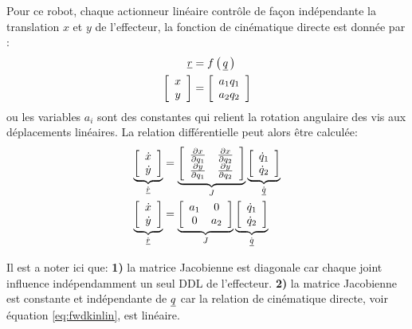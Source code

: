 \begin{example}
Pour ce robot, chaque actionneur linéaire contrôle de façon indépendante la translation $x$ et $y$ de l'effecteur, la fonction de cinématique directe est donnée par :
\begin{align}
\quad \underline{r} &= f\left( \, \underline{q} \, \right)  \\
\left[ \begin{array}{c} x \\ y  \end{array} \right]  &= \left[ \begin{array}{c} a_1 q_1 \\ a_2 q_2  \end{array} \right]
\label{eq:fwdkinlin}
\end{align}
ou les variables $a_i$ sont des constantes qui relient la rotation angulaire des vis aux déplacements linéaires. La relation différentielle peut alors être calculée:
\begin{align}
\underbrace{ \left[ \begin{array}{c} \dot{x} \\ \dot{y}  \end{array} \right] }_{\dot{\underline{r}}}
 &= 
\underbrace{ \left[ \begin{array}{c c } 
\frac{\partial x }{\partial q_1}   & \frac{\partial x }{\partial q_2} \\ 
\frac{\partial y }{\partial q_1}   & \frac{\partial y }{\partial q_2}
\end{array} \right]  }_{ J } 
\underbrace{ \left[ \begin{array}{c} 
\dot{q}_1 \\ 
\dot{q}_2 
\end{array} \right]}_{ \dot{\underline{q}} } \\
\underbrace{ \left[ \begin{array}{c} \dot{x} \\ \dot{y}  \end{array} \right] }_{\dot{\underline{r}}}
 &= 
\underbrace{ \left[ \begin{array}{c c } 
a_1 & 0 \\ 
0   & a_2
\end{array} \right]  }_{ J } 
\underbrace{ \left[ \begin{array}{c} 
\dot{q}_1 \\ 
\dot{q}_2 
\end{array} \right]}_{ \dot{\underline{q}} } \\
\end{align} 

Il est a noter ici que: \textbf{1)} la matrice Jacobienne est diagonale car chaque joint influence indépendamment un seul DDL de l'effecteur. \textbf{2)} la matrice Jacobienne est constante et indépendante de $\underline{q}$ car la relation de cinématique directe, voir équation \eqref{eq:fwdkinlin}, est linéaire. 
\end{example}

